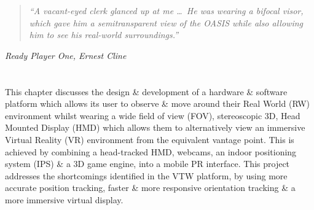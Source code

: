 \begin{quote}
	\textit{``A vacant-eyed clerk glanced up at me \ldots\ He was wearing a bifocal visor, which gave him a semitransparent view of the OASIS while also allowing him to see his real-world surroundings.''}%
\end{quote}
\hfill \textit{Ready Player One, Ernest Cline}
\\
\\
\\


This chapter discusses the design \& development of a hardware \& software platform which allows its user to observe \& move around their Real World (RW) environment whilst wearing a wide field of view (FOV), stereoscopic 3D, Head Mounted Display (HMD) which allows them to alternatively view an immersive Virtual Reality (VR) environment from the equivalent vantage point. This is achieved by combining a head-tracked HMD, webcams, an indoor positioning system (IPS) \& a 3D game engine, into a mobile PR interface. This project addresses the shortcomings identified in the VTW platform, by using more accurate position tracking, faster \& more responsive orientation tracking \& a more immersive virtual display.




